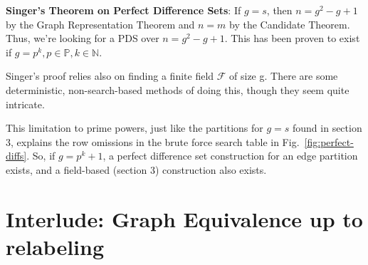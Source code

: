 \documentclass[11pt, oneside]{article} 	%
\begin{document}
\begin{framed}
\textbf{Singer's Theorem on Perfect Difference Sets}: If $g=s$, then $n=g^2-g+1$ by the Graph Representation Theorem and $n=m$ by the Candidate Theorem. Thus, we're looking for a PDS over $n=g^2-g+1$. This has been proven to exist if $g =p^k, p \in \mathbb{P}, k \in \mathbb{N}$. 
\end{framed}

Singer's proof relies also on finding a finite field $\mathcal{F}$ of size g. There are some deterministic, non-search-based methods of doing this\cite{4}, though they seem quite intricate.

This limitation to prime powers, just like the partitions for $g=s$ found in section 3, explains the row omissions in the brute force search table in Fig.~\ref{fig:perfect-diffs}. So, if $g=p^k+1$, a perfect difference set construction for an edge partition exists, and a field-based (section 3) construction also exists. 

\section{Interlude: Graph Equivalence up to relabeling}
\end{document}
